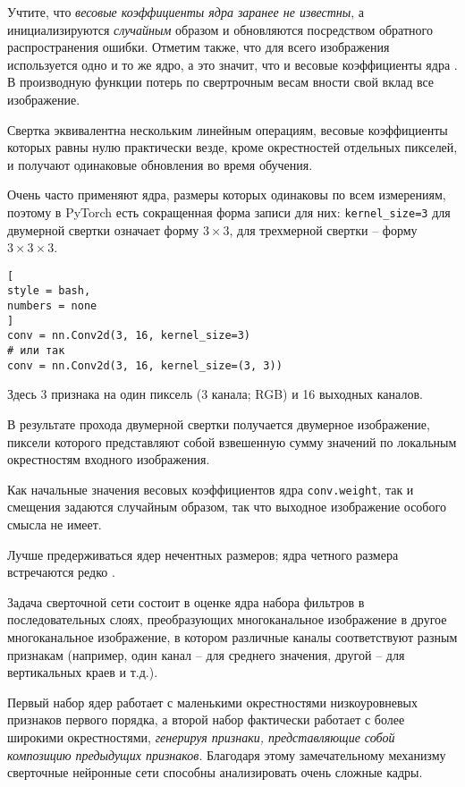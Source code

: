 \documentclass[%
	11pt,
	a4paper,
	utf8,
		]{article}
\begin{document}
Учтите, что \emph{весовые коэффициенты ядра заранее не известны}, а инициализируются \emph{случайным} образом и обновляются посредством обратного распространения ошибки. Отметим также, что для всего изображения используется одно и то же ядро, а это значит, что и весовые коэффициенты ядра \cite[]{pytorch-2022}. В производную функции потерь по свертрочным весам вности свой вклад все изображение.

Свертка эквивалентна нескольким линейным операциям, весовые коэффициенты которых равны нулю практически везде, кроме окрестностей отдельных пикселей, и получают одинаковые обновления во время обучения.

Очень часто применяют ядра, размеры которых одинаковы по всем измерениям, поэтому в PyTorch есть сокращенная форма записи для них: \verb|kernel_size=3| для двумерной свертки означает форму $3 \times 3$, для трехмерной свертки -- форму $3 \times 3 \times 3$.
\begin{lstlisting}[
style = bash,
numbers = none
]
conv = nn.Conv2d(3, 16, kernel_size=3)
# или так
conv = nn.Conv2d(3, 16, kernel_size=(3, 3))
\end{lstlisting}

Здесь 3 признака на один пиксель (3 канала; RGB) и 16 выходных каналов.

В результате прохода двумерной свертки получается двумерное изображение, пиксели которого представляют собой взвешенную сумму значений по локальным окрестностям входного изображения.

Как начальные значения весовых коэффициентов ядра \verb|conv.weight|, так и смещения задаются случайным образом, так что выходное изображение особого смысла не имеет.

Лучше предерживаться ядер нечентных размеров; ядра четного размера встречаются редко \cite[]{pytorch-2022}.

Задача сверточной сети состоит в оценке ядра набора фильтров в последовательных слоях, преобразующих многоканальное изображение в другое многоканальное изображение, в котором различные каналы соответствуют разным признакам (например, один канал -- для среднего значения, другой -- для вертикальных краев и т.д.).

Первый набор ядер работает с маленькими окрестностями низкоуровневых признаков первого порядка, а второй набор фактически работает с более широкими окрестностями, \emph{генерируя признаки, представляющие собой композицию предыдущих признаков}. Благодаря этому замечательному механизму сверточные нейронные сети способны анализировать очень сложные кадры.
\end{document}
